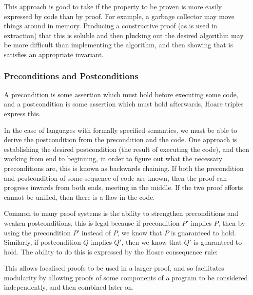 This approach is good to take if the property to be proven is more
easily expressed by code than by proof. For example, a garbage
collector may move things around in memory. Producing a constructive
proof (as is used in extraction) that this is soluble and then
plucking out the desired algorithm may be more difficult than
implementing the algorithm, and then showing that is satisfies an
appropriate invariant.

\subsubsection{Preconditions and Postconditions}
\label{sec:lit-verification-embedding-conditions}

A precondition is some assertion which must hold before executing some
code, and a postcondition is some assertion which must hold
afterwards\cite{Hoare69}, Hoare triples express this.

In the case of languages with formally specified semantics, we must be
able to derive the postcondition from the precondition and the
code. One approach is establishing the desired postcondition (the
result of executing the code), and then working from end to beginning,
in order to figure out what the necessary preconditions are, this is
known as backwards chaining\cite{Russell05}. If both the precondition
and postcondition of some sequence of code are known, then the proof
can progress inwards from both ends, meeting in the middle. If the two
proof efforts cannot be unified, then there is a flaw in the code.

Common to many proof systems is the ability to strengthen
preconditions and weaken postconditions\cite{Hoare69}, this is legal
because if precondition $P'$ implies $P$, then by using the
precondition $P'$ instead of $P$, we know that $P$ is guaranteed to
hold. Similarly, if postcondition $Q$ implies $Q'$, then we know that
$Q'$ is guaranteed to hold. The ability to do this is expressed by the
Hoare consequence rule:

\begin{prooftree}
\end{prooftree}

This allows localised proofs to be used in a larger proof, and so
facilitates modularity by allowing proofs of some components of a
program to be considered independently, and then combined later on.

